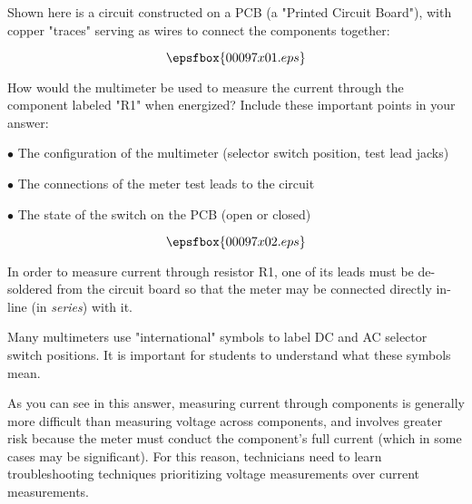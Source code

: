 

Shown here is a circuit constructed on a PCB (a "Printed Circuit Board"), with copper "traces" serving as wires to connect the components together:

$$\epsfbox{00097x01.eps}$$

How would the multimeter be used to measure the current through the component labeled "R1" when energized?  Include these important points in your answer:

\item {$\bullet$} The configuration of the multimeter (selector switch position, test lead jacks)
\item {$\bullet$} The connections of the meter test leads to the circuit
\item {$\bullet$} The state of the switch on the PCB (open or closed)







$$\epsfbox{00097x02.eps}$$

In order to measure current through resistor R1, one of its leads must be de-soldered from the circuit board so that the meter may be connected directly in-line (in {\it series}) with it.







Many multimeters use "international" symbols to label DC and AC selector switch positions.  It is important for students to understand what these symbols mean.

As you can see in this answer, measuring current through components is generally more difficult than measuring voltage across components, and involves greater risk because the meter must conduct the component's full current (which in some cases may be significant).  For this reason, technicians need to learn troubleshooting techniques prioritizing voltage measurements over current measurements.




